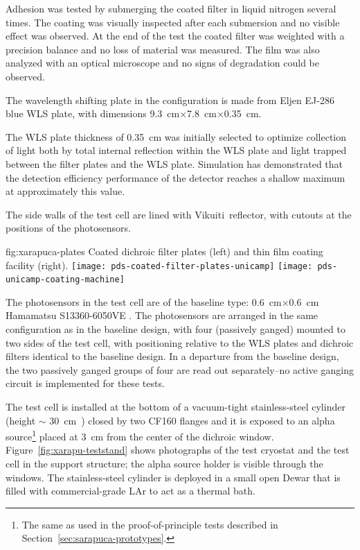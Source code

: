 Adhesion was tested by submerging the coated filter in liquid nitrogen several times. The coating was visually inspected after each submersion and no visible effect was observed. At the end of the test the coated filter was weighted with a precision balance and no loss of material was measured. The film was also analyzed with an optical microscope and no signs of degradation could be observed. 


The wavelength shifting plate in the  configuration is made from Eljen EJ-286 blue WLS plate, with dimensions \SI{9.3}{cm}$\times$\SI{7.8}{cm}$\times$\SI{0.35}{cm}.  

The WLS plate thickness of \SI{0.35}{cm} was initially selected to optimize collection of light both by total internal reflection within the WLS plate and light trapped between the filter plates and the WLS plate.  Simulation has demonstrated that the detection efficiency performance of the detector reaches a shallow maximum at approximately this value.

The side walls of the test cell are lined with Vikuiti\texttrademark\ reflector, with cutouts at the positions of the photosensors.

\begin{dunefigure}{fig:xarapuca-plates}
{Coated dichroic filter plates (left) and  thin film coating facility (right).} 
	\texttt{[image: pds-coated-filter-plates-unicamp]}\quad
	\texttt{[image: pds-unicamp-coating-machine]}
\end{dunefigure}

The photosensors in the test cell are of the baseline type:  \SI{0.6}{cm}$\times$\SI{0.6}{cm} Hamamatsu S13360-6050VE .  The photosensors are arranged in the same configuration as in the baseline design, with four  (passively ganged) mounted to two sides of the test cell, with positioning relative to the WLS plates and dichroic filters identical to the baseline design.  In a departure from the baseline design, the two passively ganged groups of four  are read out separately--no active ganging circuit is implemented for these tests. 

The test cell is installed at the bottom of a  vacuum-tight  stainless-steel cylinder (height $\sim$ \SI{30}{cm)} closed by two CF160 flanges and it is exposed to an alpha source\footnote{The same as used in the  proof-of-principle tests described in Section~\ref{sec:sarapuca-prototypes}.} 
placed at \SI{3}{cm} from the center of the dichroic window. Figure~\ref{fig:xarapu-teststand} shows photographs of the test cryostat and the test cell in the support structure; the alpha source holder is visible through the windows.
The stainless-steel cylinder  is deployed in a small open Dewar that is filled with commercial-grade LAr to act as a thermal bath.

